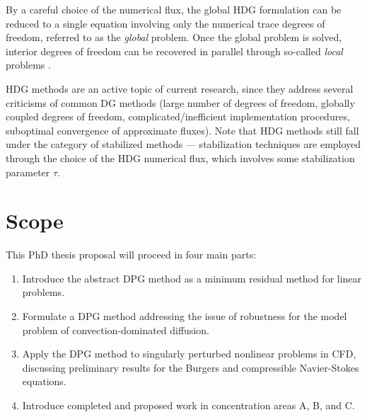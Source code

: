 By a careful choice of the numerical flux, the global HDG formulation can be reduced to a single equation involving only the numerical trace degrees of freedom, referred to as the \emph{global} problem. Once the global problem is solved, interior degrees of freedom can be recovered in parallel through so-called \emph{local} problems \cite{HDGprojection}. 

HDG methods are an active topic of current research, since they address several criticisms of common DG methods (large number of degrees of freedom, globally coupled degrees of freedom, complicated/inefficient implementation procedures, suboptimal convergence of approximate fluxes). Note that HDG methods still fall under the category of stabilized methods --- stabilization techniques are employed through the choice of the HDG numerical flux, which involves some stabilization parameter $\tau$. 

\section{Scope}

This PhD thesis proposal will proceed in four main parts:
\begin{enumerate}
\item Introduce the abstract DPG method as a minimum residual method for linear problems.
\item Formulate a DPG method addressing the issue of robustness for the model problem of convection-dominated diffusion.
\item Apply the DPG method to singularly perturbed nonlinear problems in CFD, discussing preliminary results for the Burgers and compressible Navier-Stokes equations. 
\item Introduce completed and proposed work in concentration areas A, B, and C. 
\end{enumerate}

%
%
